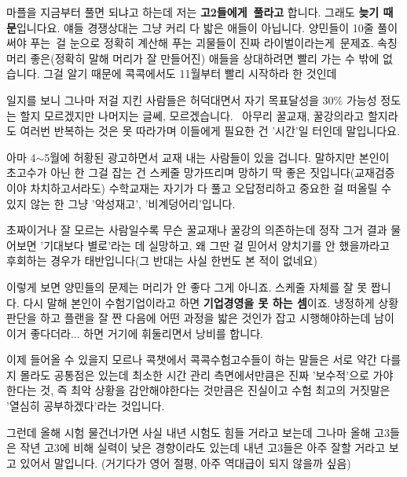 마플을 지금부터 풀면 되냐고 하는데
저는 \textbf{고2들에게 풀라고} 합니다. 그래도 \textbf{늦기 때문}입니다요.
얘들 경쟁상대는 그냥 커리 다 밟은 애들이 아닙니다.
양민들이 10줄 풀이써야 푸는 걸 눈으로 정확히 계산해 푸는 괴물들이 진짜 라이벌이라는게 문제죠.
속칭 머리 좋은(정확히 말해 머리가 잘 만들어진) 애들을 상대하려면 빨리 가는 수 밖에 없습니다.
그걸 알기 때문에 콕콕에서도 11월부터 빨리 시작하라 한 것인데
\vspace{5mm}

일지를 보니 그나마 저걸 지킨 사람들은 허덕대면서 자기 목표달성을 30$\%$ 가능성 정도는 할지 모르겠지만
나머지는 글쎄, 모르겠습니다.  아무리 꿀교재, 꿀강의라고 할지라도 여러번 반복하는 것은 못 따라가며
이들에게 필요한 건 '시간'일 터인데 말입니다요.
\vspace{5mm}

아마 4$\sim$5월에 허황된 광고하면서 교재 내는 사람들이 있을 겁니다.
말하지만 본인이 초고수가 아닌 한 그걸 잡는 건 스케줄 망가뜨리며 망하기 딱 좋은 짓입니다(교재검증이야 차치하고서라도)
수학교재는 자기가 다 풀고 오답정리하고 중요한 걸 떠올릴 수 있지 않는 한 그냥 '악성재고', '비계덩어리'입니다.
\vspace{5mm}

초짜이거나 잘 모르는 사람일수록 무슨 꿀교재나 꿀강의 의존하는데 정작 그거 결과 물어보면 '기대보다 별로'라는 데 실망하고,
왜 그딴 걸 믿어서 양치기를 안 했을까라고 후회하는 경우가 태반입니다(그 반대는 사실 한번도 본 적이 없네요)
\vspace{5mm}

이렇게 보면 양민들의 문제는 머리가 안 좋다 그게 아니죠.
스케줄 자체를 잘 못 짭니다. 다시 말해 본인이 수험기업이라고 하면 \textbf{기업경영을 못 하는 셈}이죠.
냉정하게 상황판단을 하고 플랜을 잘 짠 다음에 어떤 과정을 밟은 것인가 잡고 시행해야하는데
남이 이거 좋다더라... 하면 거기에 휘둘리면서 낭비를 합니다.
\vspace{5mm}

이제 들어올 수 있을지 모르나 콕챗에서 콕콕수험고수들이 하는 말들은 서로 약간 다를지 몰라도 공통점은 있는데
최소한 시간 관리 측면에서만큼은 진짜 '보수적'으로 가야한다는 것, 즉 최악 상황을 감안해야한다는 것만큼은 진실이고
수험 최고의 거짓말은 '열심히 공부하겠다'라는 것입니다.
\vspace{5mm}

그런데 올해 시험 물건너가면 사실 내년 시험도 힘들 거라고 보는데
그나마 올해 고3들은 작년 고3에 비해 실력이 낮은 경향이라도 있는데 내년 고3들은 아주 잘할 거라고 보고 있어서 말입니다.
(거기다가 영어 절평, 아주 역대급이 되지 않을까 싶음)
\vspace{5mm}








